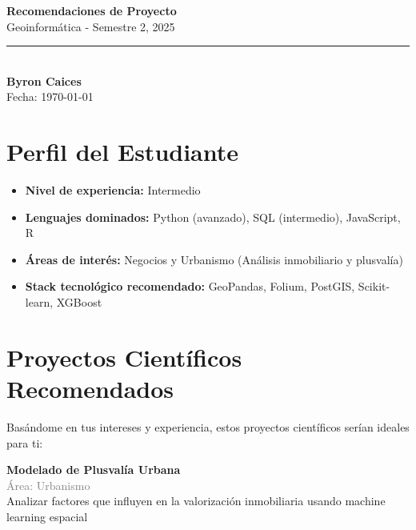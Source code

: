 \documentclass[11pt,a4paper]{article}
\begin{document}
\begin{center}
    {\Huge \textbf{Recomendaciones de Proyecto}}\\[0.5cm]
    {\Large \textcolor{usachblue}{Geoinformática - Semestre 2, 2025}}\\[0.3cm]
    \rule{\textwidth}{0.5pt}\\[0.3cm]
    {\LARGE \textbf{Byron Caices}}\\[0.2cm]
    {\large Fecha: \today}
\end{center}

\vspace{0.5cm}

\section*{ Perfil del Estudiante}

\begin{tcolorbox}[colback=blue!5,colframe=usachblue,title=Resumen de tu Perfil]
\begin{itemize}[leftmargin=*]
    \item \textbf{Nivel de experiencia:} Intermedio
    \item \textbf{Lenguajes dominados:} Python (avanzado), SQL (intermedio), JavaScript, R
    \item \textbf{Áreas de interés:} Negocios y Urbanismo (Análisis inmobiliario y plusvalía)
    \item \textbf{Stack tecnológico recomendado:} GeoPandas, Folium, PostGIS, Scikit-learn, XGBoost
\end{itemize}
\end{tcolorbox}


\section*{ Proyectos Científicos Recomendados}

Basándome en tus intereses y experiencia, estos proyectos científicos serían ideales para ti:


\begin{tcolorbox}[colback=green!5,colframe=darkgreen,title={\small Proyecto Científico \#1}]
\textbf{Modelado de Plusvalía Urbana}\\[0.2cm]
\textcolor{gray}{\small Área: Urbanismo}\\[0.2cm]
Analizar factores que influyen en la valorización inmobiliaria usando machine learning espacial
\end{tcolorbox}
\end{document}
